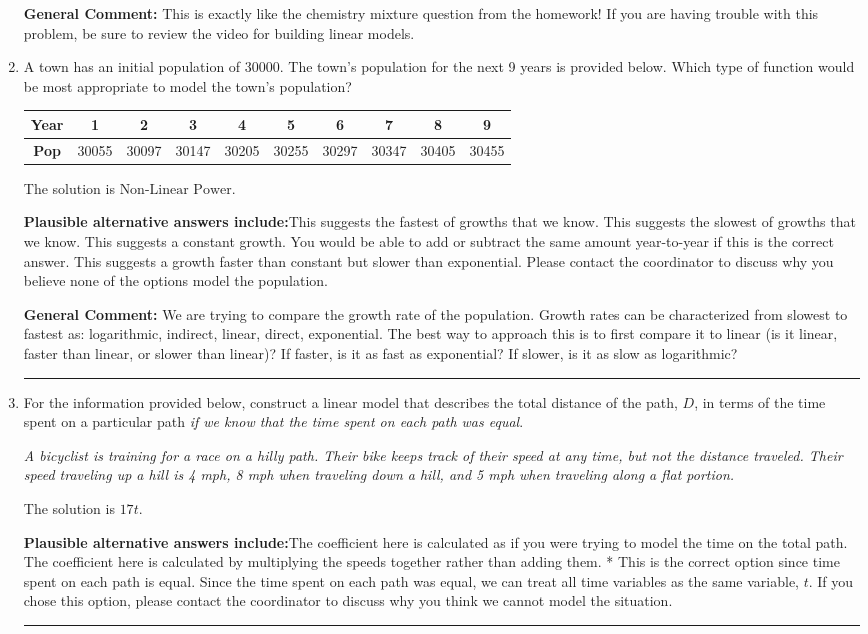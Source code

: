 \documentclass{extbook}[14pt]
\newcommand{\litem}[1]{\item #1

\rule{\textwidth}{0.4pt}}
\begin{document}
\begin{enumerate}
{\textbf{General Comment:} This is exactly like the chemistry mixture question from the homework! If you are having trouble with this problem, be sure to review the video for building linear models.
}
\litem{
A town has an initial population of 30000. The town's population for the next 9 years is provided below. Which type of function would be most appropriate to model the town's population?


\begin{tabular}{c|c|c|c|c|c|c|c|c|c}
\textbf{Year} &1 &2 &3 &4 &5 &6 &7 &8 &9\tabularnewline \hline
\textbf{Pop} &30055 &30097 &30147 &30205 &30255 &30297 &30347 &30405 &30455\end{tabular}The solution is \( \text{Non-Linear Power} \).\begin{enumerate}[label=\Alph*.]
\textbf{Plausible alternative answers include:}This suggests the fastest of growths that we know.
This suggests the slowest of growths that we know.
This suggests a constant growth. You would be able to add or subtract the same amount year-to-year if this is the correct answer.
This suggests a growth faster than constant but slower than exponential.
Please contact the coordinator to discuss why you believe none of the options model the population.
\end{enumerate}

\textbf{General Comment:} We are trying to compare the growth rate of the population. Growth rates can be characterized from slowest to fastest as: logarithmic, indirect, linear, direct, exponential. The best way to approach this is to first compare it to linear (is it linear, faster than linear, or slower than linear)? If faster, is it as fast as exponential? If slower, is it as slow as logarithmic?
}
\litem{
For the information provided below, construct a linear model that describes the total distance of the path, $D$, in terms of the time spent on a particular path \textit{if we know that the time spent on each path was equal}.

\begin{center}
    \textit{ A bicyclist is training for a race on a hilly path. Their bike keeps track of their speed at any time, but not the distance traveled. Their speed traveling up a hill is 4 mph, 8 mph when traveling down a hill, and 5 mph when traveling along a flat portion. }
\end{center}
The solution is \( 17 t \).\begin{enumerate}[label=\Alph*.]
\textbf{Plausible alternative answers include:}The coefficient here is calculated as if you were trying to model the time on the total path.
The coefficient here is calculated by multiplying the speeds together rather than adding them.
* This is the correct option since time spent on each path is equal.
Since the time spent on each path was equal, we can treat all time variables as the same variable, $t$.
If you chose this option, please contact the coordinator to discuss why you think we cannot model the situation.
\end{enumerate}

}
\end{enumerate}
\end{document}
